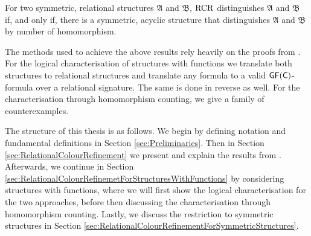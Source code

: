\begin{theorem}
For two symmetric, relational structures $\mathfrak A$ and $\mathfrak B$, $\operatorname{RCR}$ distinguishes $\mathfrak A$ and $\mathfrak B$ if, and only if, there is a symmetric, acyclic structure that distinguishes $\mathfrak A$ and $\mathfrak B$ by number of homomorphism.
\end{theorem}

The methods used to achieve the above results rely heavily on the proofs from \cite{scheidt2025ColorRefinement}.
For the logical characterisation of structures with functions we translate both structures to relational structures and translate any formula to a valid $\mathsf{GF}(\mathsf{C})$-formula over a relational signature.
The same is done in reverse as well.
For the characterisation through homomorphism counting, we give a family of counterexamples.

The structure of this thesis is as follows.
We begin by defining notation and fundamental definitions in Section \ref{sec:Preliminaries}.
Then in Section \ref{sec:RelationalColourRefinement} we present and explain the results from \cite{scheidt2025ColorRefinement}.
Afterwards, we continue in Section \ref{sec:RelationalColourRefinemetForStructuresWithFunctions} by considering structures with functions, where we will first show the logical characterisation for the two approaches, before then discussing the characterisation through homomorphism counting.
Lastly, we discuss the restriction to symmetric structures in Section \ref{sec:RelationalColourRefinementForSymmetricStructures}.




